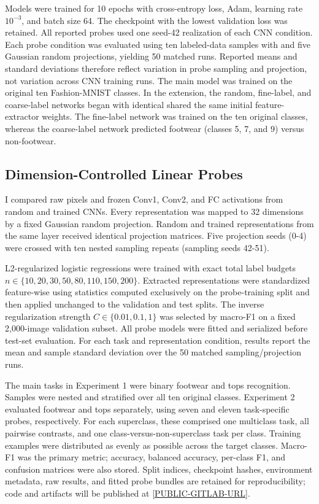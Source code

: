\documentclass[conference]{IEEEtran}
\begin{document}
Models were trained for 10 epochs with cross-entropy loss, Adam, learning rate
$10^{-3}$, and batch size 64. The checkpoint with the lowest validation loss
was retained. All reported probes used one seed-42 realization of each CNN condition. Each probe condition was evaluated using ten labeled-data samples with and five Gaussian random projections, yielding 50 matched runs. Reported means and standard deviations therefore reflect variation in probe sampling and projection, not variation across CNN training runs. The main model was trained on the original ten Fashion-MNIST classes. In the extension, the random, fine-label, and coarse-label networks began with identical shared the same initial feature-extractor weights. The fine-label network  was trained on the ten original classes, whereas the coarse-label network predicted footwear (classes 5, 7, and 9) versus non-footwear.

\subsection{Dimension-Controlled Linear Probes}
I compared raw pixels and frozen Conv1, Conv2, and FC activations from random
and trained CNNs. Every representation was mapped to 32 dimensions by a fixed
Gaussian random projection. Random and trained representations from the same
layer received identical projection matrices. Five projection seeds (0-4)
were crossed with ten nested sampling repeats (sampling seeds 42-51).

L2-regularized logistic regressions were trained with exact total label
budgets $n\in\{10,20,30,50,80,110,150,200\}$. Extracted representations were standardized feature-wise using statistics computed exclusively on the probe-training split and then applied unchanged to the validation and test splits. The inverse regularization strength
$C\in\{0.01,0.1,1\}$ was selected by macro-F1 on a fixed 2,000-image validation
subset. All probe models were fitted and serialized before test-set evaluation. For each task and representation condition, results report the mean and sample standard deviation over the 50 matched sampling/projection runs.

The main tasks in Experiment 1 were binary footwear and tops recognition.
Samples were nested and stratified over all ten original classes. Experiment 2
evaluated footwear and tops separately, using seven and eleven task-specific
probes, respectively. For each superclass, these comprised one multiclass
task, all pairwise contrasts, and one class-versus-non-superclass task per
class. Training examples were distributed as evenly as possible across the target classes. Macro-F1 was the
primary metric; accuracy, balanced accuracy, per-class F1, and confusion
matrices were also stored. Split indices, checkpoint hashes, environment
metadata, raw results, and fitted probe bundles are retained for
reproducibility; code and artifacts will be published at
\url{[PUBLIC-GITLAB-URL]}.
\end{document}
